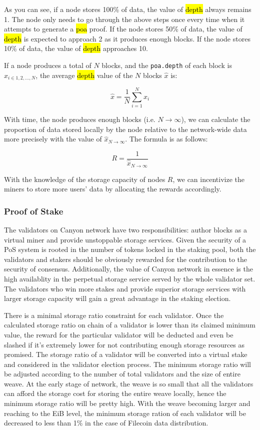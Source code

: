 \documentclass[]{article}
\newcommand{\code}[1]{{%
  \sethlcolor{inlineBG}%
  \color{inlineFG}%
  \ttfamily
  \hl{ #1 }%
}}
\newcounter{subsubsubsection}[subsubsection]
\begin{document}
As you can see, if a node stores 100\% of data, the value of \code{depth} always remains 1. The node only needs to go through the above steps once every time when it attempts to generate a \code{poa} proof. If the node stores 50\% of data, the value of \code{depth} is expected to approach 2 as it produces enough blocks. If the node stores 10\% of data, the value of \code{depth} approaches 10.

If a node produces a total of $N$ blocks, and the \texttt{poa.depth} of each block is $x_{i\in 1,2,...,N}$, the average \code{depth} value of the $N$ blocks $\hat{x}$ is:

$$
\hat{x} = \frac{1}{N} {\sum_{i=1}^N x_i}
$$

With time, the node produces enough blocks (i.e. $N \to \infty$), we can calculate the proportion of data stored locally by the node relative to the network-wide data more precisely with the value of $\hat{x}_{N \to \infty}$. The formula is as follows:

$$
R = \frac{1}{\hat{x}_{{N \to \infty}}}
$$

With the knowledge of the storage capacity of nodes $R$, we can incentivize the miners to store more users' data by allocating the rewards accordingly.

\subsubsection{Proof of Stake}


The validators on Canyon network have two responsibilities: author blocks as a virtual miner and provide unstoppable storage services. Given the security of a PoS system is rooted in the number of tokens locked in the staking pool, both the validators and stakers should be obviously rewarded for the contribution to the security of consensus. Additionally, the value of Canyon network in essence is the high availablity in the perpetual storage service served by the whole validator set. The validators who win more stakes and provide superior storage services with larger storage capacity will gain a great advantage in the staking election.

There is a minimal storage ratio constraint for each validator. Once the calculated storage ratio on chain of a validator is lower than its claimed minimum value, the reward for the particular validator will be deducted and even be slashed if it's extremely lower for not contributing enough storage resources as promised. The storage ratio of a validator will be converted into a virtual stake and considered in the validator election process. The minimum storage ratio will be adjusted according to the number of total validators and the size of entire weave. At the early stage of network, the weave is so small that all the validators can afford the storage cost for storing the entire weave locally, hence the minimum storage ratio will be pretty high. With the weave becoming larger and reaching to the EiB level, the minimum storage ration of each validator will be decreased to less than 1\% in the case of Filecoin data distribution.
\end{document}
